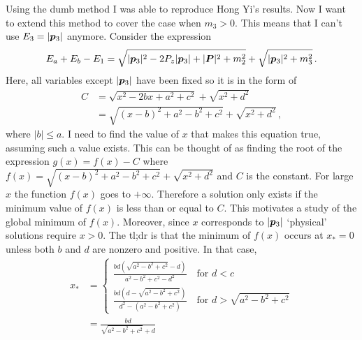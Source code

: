 Using the dumb method I was able to reproduce Hong Yi's results. 
Now I want to extend this method to cover the case when $m_3 > 0$. 
This means that I can't use $E_3 = \pmag[3]$ anymore.
Consider the expression
\begin{align}
    E_a + E_b - E_1 
    = 
    \sqrt{\pmag[3]^2 - 2 P_z \pmag[3] + |\bm{P}|^2 + m_2^2}
    + \sqrt{\pmag[3]^2 + m_3^2} \, .
\end{align}
Here, all variables except $\pmag[3]$ have been fixed so it is in the form of
\begin{align}
    C &= \sqrt{x^2 - 2 b x + a^2 + c^2} + \sqrt{x^2 + d^2} \\
    &= \sqrt{(x - b)^2 +a^2 - b^2 + c^2} + \sqrt{x^2 + d^2} \, ,
\end{align}
where $|b| \leq a$.
I need to find the value of $x$ that makes this equation true, assuming such a value exists. 
This can be thought of as finding the root of the expression $g(x) = f(x) - C$ where $f(x) = \sqrt{(x-b)^2 + a^2 - b^2 + c^2} + \sqrt{x^2 + d^2}$ and $C$ is the constant.   
For large $x$ the function $f(x)$ goes to $+\infty$. Therefore a solution only exists if the minimum value of $f(x)$ is less than or equal to $C$.
This motivates a study of the global minimum of $f(x)$. 
Moreover, since $x$ corresponds to $\pmag[3]$ `physical' solutions require $x > 0$.
The tl;dr is that the minimum of $f(x)$ occurs at $x_* = 0$ unless both $b$ and $d$ are nonzero and positive. 
In that case,
\begin{align}
    x_* 
    &= 
    \begin{cases}
        \frac{bd (\sqrt{a^2 - b^2 + c^2} - d)}{a^2 - b^2 + c^2 - d^2}  \quad \text{for } d < c \\
        \frac{bd (d - \sqrt{a^2 - b^2 + c^2})}{d^2 - (a^2 - b^2 + c^2)} \quad \text{for } d > \sqrt{a^2 - b^2 + c^2}
    \end{cases} \\
    &= 
    \frac{b d}{\sqrt{a^2 - b^2 + c^2} + d}
\end{align}

